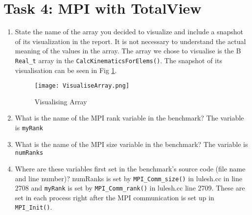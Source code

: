 \documentclass{article}
\begin{document}
\section{Task 4: MPI with TotalView}
\begin{enumerate}
	\item State the name of the array you decided to visualize and include a snapshot of its visualization in the report. It is not necessary to understand the actual meaning of the values in the array.
	The array we chose to visualise is the B \verb!Real_t! array in the \verb!CalcKinematicsForElems()!. The snapshot of its visualisation can be seen in Fig \ref{fig:visual_array}.
	
			\begin{figure}[p] %
		\begin{center}
			\texttt{[image: VisualiseArray.png]}
		\caption{Visualising Array}
		\label{fig:visual_array}
		\end{center}
	\end{figure}
	
	\item What is the name of the MPI rank variable in the benchmark?
	The variable is \verb!myRank!
	\item What is the name of the MPI size variable in the benchmark?
	The variable is \verb!numRanks!
	\item Where are these variables first set in the benchmark’s source code (file name and line number)?
	numRanks is set by \verb!MPI_Comm_size()! in lulesh.cc in line 2708 and \verb!myRank! is set by \verb!MPI_Comm_rank()! in lulesh.cc line 2709. These are set in each process right after the MPI communication is set up in \verb!MPI_Init()!.

\end{enumerate}
\end{document}
